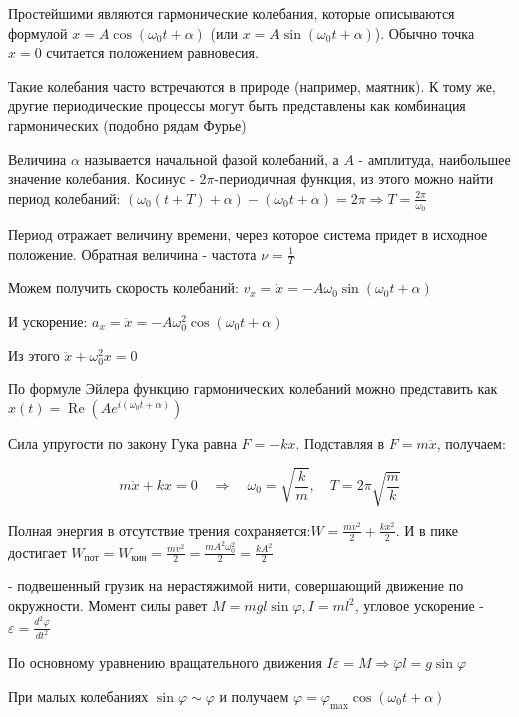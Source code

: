 \mediumvspace

Простейшими являются гармонические колебания, которые описываются формулой $x = A \cos (\omega_0 t + \alpha)$ 
(или $x = A \sin (\omega_0 t + \alpha)$). Обычно точка $x = 0$ считается положением равновесия. 

Такие колебания часто встречаются в природе (например, маятник). К тому же, другие периодические процессы 
могут быть представлены как комбинация гармонических (подобно рядам Фурье)

Величина $\alpha$ называется начальной фазой колебаний, а $A$ - амплитуда, наибольшее значение колебания. 
Косинус - $2\pi$-периодичная функция, из этого можно найти период колебаний: $(\omega_0 (t + T) + \alpha) - (\omega_0 t + \alpha) = 2\pi \Longrightarrow T = \frac{2\pi}{\omega_0}$

Период отражает величину времени, через которое система придет в исходное положение. Обратная величина - частота $\nu = \frac{1}{T}$

Можем получить скорость колебаний: $v_x = \dot x = -A \omega_0 \sin (\omega_0 t + \alpha)$

И ускорение: $a_x = \ddot x = -A \omega_0^2 \cos (\omega_0 t + \alpha)$

Из этого $\ddot x + \omega_0^2 x = 0$

По формуле Эйлера функцию гармонических колебаний можно представить как $x(t) = \operatorname{Re} (Ae^{i(\omega_0 t + \alpha)})$

 Сила упругости по закону Гука равна $F = -kx$. Подставляя в $F = m\ddot{x}$, получаем:

\[
m\ddot{x} + kx = 0 \quad \Longrightarrow \quad \omega_0 = \sqrt{\frac{k}{m}}, \quad T = 2\pi\sqrt{\frac{m}{k}}
\]

Полная энергия в отсутствие трения сохраняется:$W = \frac{mv^2}{2} + \frac{kx^2}{2}$.
И в пике достигает $W_{\text{пот}} = W_{\text{кин}} = \frac{mv^2}{2} = \frac{mA^2\omega_0^2}{2} = \frac{kA^2}{2}$
    
 - подвешенный грузик на нерастяжимой нити, совершающий движение по окружности.
Момент силы равет $M = m g l \sin \varphi, I = m l^2$, угловое ускорение - $\varepsilon = \frac{d^2 \varphi}{d t^2}$

По основному уравнению вращательного движения $I \varepsilon = M \Longrightarrow \ddot \varphi l = g \sin \varphi$

При малых колебаниях $\sin \varphi \sim \varphi$ и получаем $\varphi = \varphi_{\max} \cos (\omega_0 t + \alpha)$

